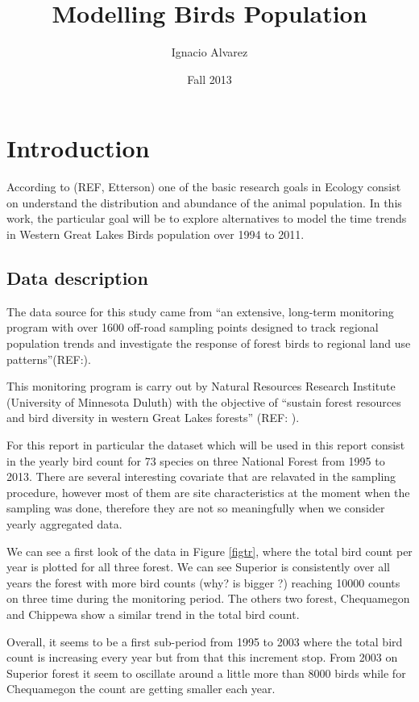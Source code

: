 \documentclass{article}
\title{ Modelling Birds Population }
\author{Ignacio Alvarez}
\date{ Fall 2013 }
\begin{document}
\maketitle 

\vspace{3cm}

\section{Introduction} 
According to (REF, Etterson) one of the basic research goals in Ecology consist on understand the distribution and abundance of the animal population. In this work, the particular goal will be to explore alternatives to model the time trends in Western Great Lakes Birds population over 1994 to 2011. 

\subsection{Data description}

The data source for this study came from ``an extensive, long-term monitoring program with over 1600 off-road sampling points designed to track regional population trends and investigate the response of forest birds to regional land use patterns''(REF:). 

This monitoring program is carry out by Natural Resources Research Institute (University of Minnesota Duluth) with the objective of ``sustain forest resources and bird diversity in western Great Lakes forests'' (REF: ). 

For this report in particular the dataset which will be used in this report consist in the yearly bird count for 73 species on three National Forest from 1995 to 2013. There are several interesting covariate that are relavated in the sampling procedure, however most of them are site characteristics at the moment when the sampling was done, therefore they are not so meaningfully when we consider yearly aggregated data.  

We can see a first look of the data in Figure \ref{figtr}, where the total bird count per year is plotted for all three forest. We can see Superior is consistently over all years the forest with more bird counts (why? is bigger ?) reaching 10000 counts on three time during the monitoring period. The others two forest, Chequamegon and Chippewa show a similar trend in the total bird count. 

Overall, it seems to be a first sub-period from 1995 to 2003 where the total bird count is increasing every year but from that this increment stop. From 2003 on Superior forest it seem to oscillate around a little more than 8000 birds while for Chequamegon the count are getting smaller each year. 
\end{document}

